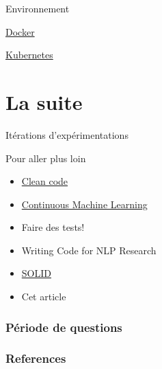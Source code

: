 \documentclass[aspectratio=169,10pt,xcolor=x11names,english,french]{beamer}
\begin{document}
	\begin{frame}{Environnement}
			\begin{minipage}{0.49\linewidth}
				\centering
				 \vfil
				\vspace{1em}
				\href{https://www.docker.com/}{Docker}
			\end{minipage}
			\begin{minipage}{0.49\linewidth}
				\centering
				 \vfil
				\vspace{1em}
				\href{https://kubernetes.io/fr/}{Kubernetes}
			\end{minipage}
		\end{frame}
		
	\section{La suite}
	\begin{frame}
		\centering
		\fontsize{35}{35}\selectfont\textcolor[cmyk]{0.67, 0.66, 0, 0.71}\faRefresh\vfil
		\vspace{1em}
		\normalsize Itérations d'expérimentations
	\end{frame}
	
	\begin{frame}{Pour aller plus loin}
		\begin{itemize}
			\item \href{https://www.oreilly.com/library/view/clean-code-a/9780136083238/}{Clean code}
			\item \href{https://github.com/iterative/cml}{Continuous Machine Learning}
			\item Faire des tests!
			\item Writing Code for NLP Research \cite{gardner-etal-2018-writing}
			\item \href{https://www.youtube.com/watch?v=t86v3N4OshQ&list=LLFp5G_2HoipBrGaw9iAcPPw&index=693}{SOLID}
			\item Cet article \cite{pineau2020improving}
		\end{itemize}
	\end{frame}
	
	\begin{frame}
		\frametitle{Période de questions}
		
		\centering
		\fontsize{100}{100}\selectfont\textcolor[cmyk]{0.67, 0.66, 0, 0.71}
		\faQuestion
		
	\end{frame}

	
	
	\begin{frame}[t, allowframebreaks]
		\frametitle{References}
		
		
	\end{frame}
	
	
	
\end{document}
